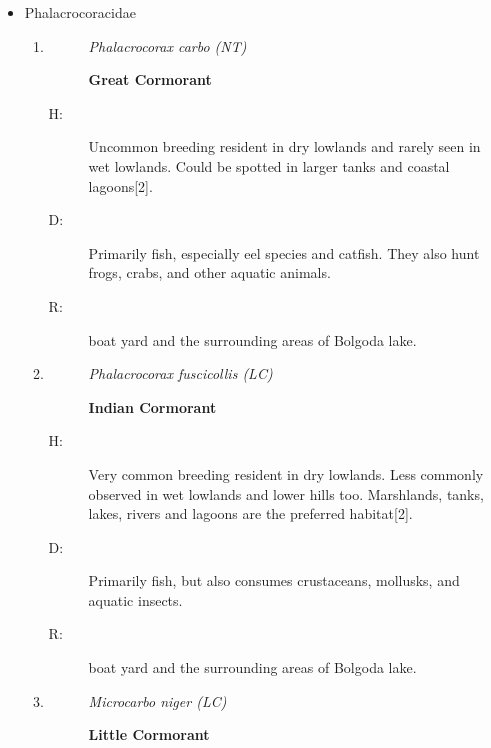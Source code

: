 \begin{itemize}
\begin{enumerate}
%
\end{enumerate}%
\item%
Phalacrocoracidae%
\begin{enumerate}%
\item%
\begin{description}%
\item[]%
\textit{Phalacrocorax carbo (NT)}%
\item[]%
\textbf{Great Cormorant}%
\end{description}%
\begin{description}%
\item[H: ]%
Uncommon breeding resident in dry lowlands and rarely seen in wet lowlands. Could be spotted in larger tanks and coastal lagoons{[}2{]}.%
\item[D: ]%
Primarily fish, especially eel species and catfish. They also hunt frogs, crabs, and other aquatic animals.%
\item[R: ]%
boat yard and the surrounding areas of Bolgoda lake.%
\end{description}%
\item%
\begin{description}%
\item[]%
\textit{Phalacrocorax fuscicollis (LC)}%
\item[]%
\textbf{Indian Cormorant}%
\end{description}%
\begin{description}%
\item[H: ]%
Very common breeding resident in dry lowlands. Less commonly observed in wet lowlands and lower hills too. Marshlands, tanks, lakes, rivers and lagoons are the preferred habitat{[}2{]}.%
\item[D: ]%
Primarily fish, but also consumes crustaceans, mollusks, and aquatic insects.%
\item[R: ]%
boat yard and the surrounding areas of Bolgoda lake.%
\end{description}%
\item%
\begin{description}%
\item[]%
\textit{Microcarbo niger (LC)}%
\item[]%
\textbf{Little Cormorant}%

\end{description}
\end{enumerate}
\end{itemize}
